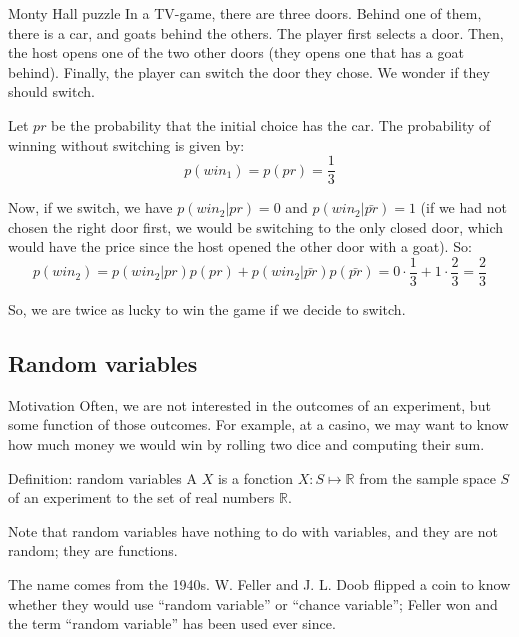 \documentclass[a4paper]{article}
\begin{document}
\begin{parag}{Monty Hall puzzle}
    In a TV-game, there are three doors. Behind one of them, there is a car, and goats behind the others. The player first selects a door. Then, the host opens one of the two other doors (they opens one that has a goat behind). Finally, the player can switch the door they chose. We wonder if they should switch.

    Let $pr$ be the probability that the initial choice has the car. The probability of winning without switching is given by: 
    \[p\left(win_1\right) = p\left(pr\right) = \frac{1}{3}\]
    
    Now, if we switch, we have $p\left(win_2 | pr\right) = 0$ and $p\left(win_2 | \bar{pr}\right) = 1$ (if we had not chosen the right door first, we would be switching to the only closed door, which would have the price since the host opened the other door with a goat). So: 
    \[p\left(win_2\right) = p\left(win_2 | pr\right)p\left(pr\right) + p\left(win_2 | \bar{pr}\right)p\left(\bar{pr}\right) = 0 \cdot \frac{1}{3} + 1 \cdot \frac{2}{3} = \frac{2}{3}\]
    
    So, we are twice as lucky to win the game if we decide to switch.
\end{parag}

\subsection{Random variables}
\begin{parag}{Motivation}
    Often, we are not interested in the outcomes of an experiment, but some function of those outcomes. For example, at a casino, we may want to know how much money we would win by rolling two dice and computing their sum.
\end{parag}

\begin{parag}{Definition: random variables}
    A  $X$ is a fonction $X : S \mapsto \mathbb{R}$ from the sample space $S$ of an experiment to the set of real numbers $\mathbb{R}$.

    Note that random variables have nothing to do with variables, and they are not random; they are functions.

    The name comes from the 1940s. W. Feller and J. L. Doob flipped a coin to know whether they would use ``random variable'' or ``chance variable''; Feller won and the term ``random variable'' has been used ever since.
\end{parag}
\end{document}
